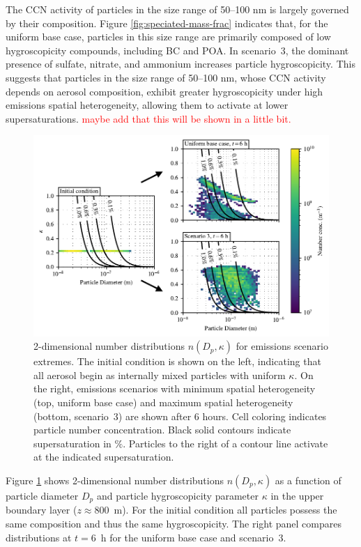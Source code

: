 \documentclass[journal abbreviation, manuscript]{copernicus}
\begin{document}
The CCN activity of particles in the size range of 50--100 nm is
largely governed by their composition. Figure
\ref{fig:speciated-mass-frac} indicates that, for the uniform base
case, particles in this size range are primarily composed of low
hygroscopicity compounds, including BC and POA. In scenario~3, the
dominant presence of sulfate, nitrate, and ammonium increases particle
hygroscopicity.  This suggests that particles in the size range of
50--100 nm, whose CCN activity depends on aerosol composition, exhibit
greater hygroscopicity under high emissions spatial heterogeneity,
allowing them to activate at lower
supersaturations. \textcolor{red}{maybe add that this will be shown in
  a little bit.}

\begin{figure}[!t]
	\centering
	\includegraphics[]{figures/2d-kappa-dist-three-panel-z40.pdf}
	\caption{2-dimensional number distributions $n(D_p, \kappa)$ for emissions scenario extremes. The initial condition is shown on the left, indicating that all aerosol begin as internally mixed particles with uniform $\kappa$. On the right, emissions scenarios with minimum spatial heterogeneity (top, uniform base case) and maximum spatial heterogeneity (bottom, scenario~3) are shown after 6 hours. Cell coloring indicates particle number concentration. Black solid contours indicate supersaturation in $\%$. Particles to the right of a contour line activate at the indicated supersaturation.}
	\label{fig:kappa-dist}
\end{figure} 

Figure \ref{fig:kappa-dist} shows 2-dimensional number distributions
$n(D_p, \kappa)$ as a function of particle diameter $D_p$ and particle
hygroscopicity parameter $\kappa$ in the upper boundary layer
($z\approx 800$~m). For the initial condition all particles possess
the same composition and thus the same hygroscopicity.  The right
panel compares distributions at $t=6$~h for the uniform base case and
scenario~3.
\end{document}
